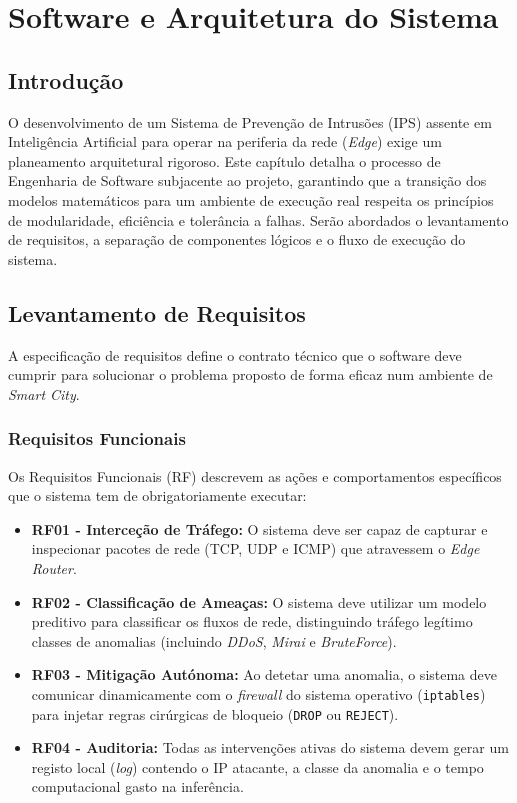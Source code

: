 \chapter{Software e Arquitetura do Sistema}
\label{chap:eng_software}

\section{Introdução}
\label{sec:es_introducao}
O desenvolvimento de um Sistema de Prevenção de Intrusões (IPS) assente em Inteligência Artificial para operar na periferia da rede (\textit{Edge}) exige um planeamento arquitetural rigoroso. Este capítulo detalha o processo de Engenharia de Software subjacente ao projeto, garantindo que a transição dos modelos matemáticos para um ambiente de execução real respeita os princípios de modularidade, eficiência e tolerância a falhas. Serão abordados o levantamento de requisitos, a separação de componentes lógicos e o fluxo de execução do sistema.

\section{Levantamento de Requisitos}
\label{sec:es_requisitos}
A especificação de requisitos define o contrato técnico que o software deve cumprir para solucionar o problema proposto de forma eficaz num ambiente de \textit{Smart City}.

\subsection{Requisitos Funcionais}
Os Requisitos Funcionais (RF) descrevem as ações e comportamentos específicos que o sistema tem de obrigatoriamente executar:
\begin{itemize}
    \item \textbf{RF01 - Interceção de Tráfego:} O sistema deve ser capaz de capturar e inspecionar pacotes de rede (TCP, UDP e ICMP) que atravessem o \textit{Edge Router}.
    \item \textbf{RF02 - Classificação de Ameaças:} O sistema deve utilizar um modelo preditivo para classificar os fluxos de rede, distinguindo tráfego legítimo classes de anomalias (incluindo \textit{DDoS}, \textit{Mirai} e \textit{BruteForce}).
    \item \textbf{RF03 - Mitigação Autónoma:} Ao detetar uma anomalia, o sistema deve comunicar dinamicamente com o \textit{firewall} do sistema operativo (\texttt{iptables}) para injetar regras cirúrgicas de bloqueio (\texttt{DROP} ou \texttt{REJECT}).
    \item \textbf{RF04 - Auditoria:} Todas as intervenções ativas do sistema devem gerar um registo local (\textit{log}) contendo o IP atacante, a classe da anomalia e o tempo computacional gasto na inferência.
\end{itemize}

